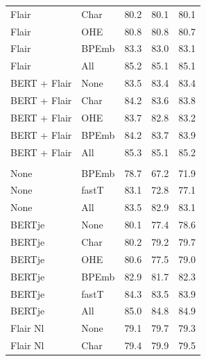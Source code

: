 \documentclass[12pt,a4paper,]{book}
\begin{document}
\begin{longtable}[t]{llrrr}
\hspace{1em}Flair & Char & 80.2 & 80.1 & 80.1\\
\hspace{1em}Flair & OHE & 80.8 & 80.8 & 80.7\\
\hspace{1em}Flair & BPEmb & 83.3 & 83.0 & 83.1\\
\hspace{1em}Flair & All & 85.2 & 85.1 & 85.1\\
\hspace{1em}BERT + Flair & None & 83.5 & 83.4 & 83.4\\
\hspace{1em}BERT + Flair & Char & 84.2 & 83.6 & 83.8\\
\hspace{1em}BERT + Flair & OHE & 83.7 & 82.8 & 83.2\\
\hspace{1em}BERT + Flair & BPEmb & 84.2 & 83.7 & 83.9\\
\hspace{1em}BERT + Flair & All & 85.3 & 85.1 & 85.2\\
\addlinespace[0.3em]
\multicolumn{5}{l}{\textbf{Dutch embeddings}}\\
\hspace{1em}None & BPEmb & 78.7 & 67.2 & 71.9\\
\hspace{1em}None & fastT & 83.1 & 72.8 & 77.1\\
\hspace{1em}None & All & 83.5 & 82.9 & 83.1\\
\hspace{1em}BERTje & None & 80.1 & 77.4 & 78.6\\
\hspace{1em}BERTje & Char & 80.2 & 79.2 & 79.7\\
\hspace{1em}BERTje & OHE & 80.6 & 77.5 & 79.0\\
\hspace{1em}BERTje & BPEmb & 82.9 & 81.7 & 82.3\\
\hspace{1em}BERTje & fastT & 84.3 & 83.5 & 83.9\\
\hspace{1em}BERTje & All & 85.0 & 84.8 & 84.9\\
\hspace{1em}Flair Nl & None & 79.1 & 79.7 & 79.3\\
\hspace{1em}Flair Nl & Char & 79.4 & 79.9 & 79.5\\

\end{longtable}
\end{document}
